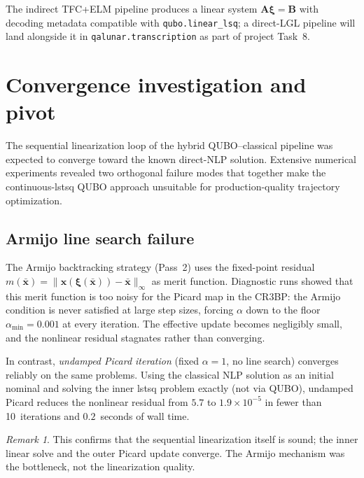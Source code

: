 \documentclass[8pt,a4paper]{article}
\newcommand{\bvec}[1]{\bm{#1}}
\newcommand{\xvec}{\bvec{x}}
\newcommand{\Amat}{\bvec{A}}
\newcommand{\Bmat}{\bvec{B}}
\theoremstyle{definition}
\theoremstyle{remark}
\newtheorem*{remark}{Remark}
\begin{document}
The indirect TFC+ELM pipeline produces a linear system
$\Amat \bm\xi = \Bmat$ with decoding metadata compatible with
\texttt{qubo.linear\_lsq}; a direct-LGL pipeline will land alongside
it in \texttt{qalunar.transcription} as part of project Task~8.


\section{Convergence investigation and pivot}\label{sec:convergence-investigation}

The sequential linearization loop of the hybrid QUBO--classical pipeline
was expected to converge toward the known direct-NLP solution.
Extensive numerical experiments revealed two orthogonal failure modes
that together make the continuous-lstsq QUBO approach unsuitable for
production-quality trajectory optimization.

\subsection{Armijo line search failure}

The Armijo backtracking strategy (Pass~2) uses the fixed-point residual
$m(\bar{\xvec}) = \|\xvec(\bm\xi(\bar{\xvec})) - \bar{\xvec}\|_\infty$
as merit function.
Diagnostic runs showed that this merit function is too noisy for the
Picard map in the CR3BP: the Armijo condition is never satisfied at
large step sizes, forcing $\alpha$ down to the floor
$\alpha_{\min} = 0.001$ at every iteration.
The effective update becomes negligibly small, and the nonlinear
residual stagnates rather than converging.

In contrast, \emph{undamped Picard iteration} (fixed $\alpha=1$, no
line search) converges reliably on the same problems.  Using the
classical NLP solution as an initial nominal and solving the inner
lstsq problem exactly (not via QUBO), undamped Picard reduces the
nonlinear residual from $5.7$ to $1.9 \times 10^{-5}$ in fewer than
10~iterations and $0.2$~seconds of wall time.

\begin{remark}
This confirms that the sequential linearization itself is sound; the
inner linear solve and the outer Picard update converge.  The Armijo
mechanism was the bottleneck, not the linearization quality.
\end{remark}
\end{document}
